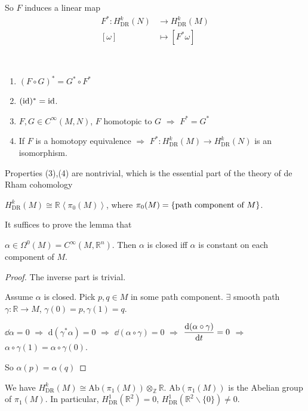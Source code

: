 So  $ F $ induces a linear map
\begin{equation*}
    \begin{aligned}
        F^*:H^k_{\mathrm{DR}}(N)&\rightarrow H^k_{\mathrm{DR}}(M)\\
        [\omega]&\mapsto [F^*\omega]
    \end{aligned}
\end{equation*}
\begin{proposition}\label{key properties of de Rham cohomology}
    \,
    \begin{enumerate}[label=(\arabic*)]
        \item  $ (F\circ G)^*=G^* \circ F^* $
        \item  $ (\mathrm{id})^*=\mathrm{id} $.
        \item  $ F,G\in C^\infty(M,N) $,  $ F $ homotopic to  $ G $ $ \Rightarrow  $ $ F^*=G^* $
        \item If  $ F $ is a homotopy equivalence $ \Rightarrow $  $ F^*:H^k_{\mathrm{DR}}(M)\rightarrow H^k_{\mathrm{DR}}(N) $  is an isomorphism.
    \end{enumerate}
\end{proposition}
\begin{remark}
    Properties (3),(4) are nontrivial, which is the essential part of the theory of de Rham cohomology
\end{remark}
\begin{proposition}\label{Computation of cohomology at 0}
     $ H^k_{\mathrm{DR}}(M)\cong \mathbb{R} \left<\pi_0(M)\right>$, where  $ \pi_0(M)=\{\text{path component of  $ M $}\} $.
\end{proposition}
It suffices to prove the lemma that
\begin{lemma}
     $ \alpha\in \Omega^0(M)=C^\infty(M,\mathbb{R}^n) $. Then $ \alpha $ is closed iff  $ \alpha $  is constant on each component of  $ M $.
\end{lemma}
\begin{proof}
    The inverse part is trivial.

    Assume  $ \alpha $ is closed. Pick  $ p,q\in M $ in some path component.  $ \exists $ smooth path  $ \gamma:\mathbb{R}\rightarrow M $,  $ \gamma(0)=p,\gamma(1)=q $.

    $ \dd \alpha=0 $ $ \Rightarrow  $  $ \mathrm{d}(\gamma^*\alpha)=0 $ $ \Rightarrow  $  $ \dd(\alpha\circ \gamma)=0 $  $ \Rightarrow $ $ \displaystyle\frac{\mathrm{d} (\alpha\circ \gamma)}{\mathrm{d} t}=0 $ $ \Rightarrow  $ $ \alpha\circ \gamma(1)=\alpha\circ\gamma(0) $.

    So  $ \alpha(p)=\alpha(q) $
\end{proof}
We have  $ H^k_{\mathrm{DR}}(M)\cong \mathrm{Ab}(\pi_1(M))\otimes_\mathbb{Z} \mathbb{R} $.  $  \mathrm{Ab}(\pi_1(M)) $ is the Abelian group of  $ \pi_1(M) $. In particular,  $ H^1_{\mathrm{DR}}(\mathbb R^2)=0 $,  $ H^1_{\mathrm{DR}}(\mathbb R^2\backslash \{0\})\neq 0 $.

